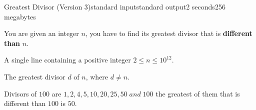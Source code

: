 \begin{problem}{Greatest Divisor (Version 3)}{standard input}{standard output}{2 seconds}{256 megabytes}

You are given an integer $n$, you have to find its greatest divisor that is \textbf{different than} $n$.

\InputFile
A single line containing a positive integer $2 \leq n \leq 10^{12} $.

\OutputFile
The greatest divisor $d$ of $n$, where $d \neq n$.

\Example

\begin{example}
%
\end{example}

\Note
Divisors of $100$ are $1, 2, 4, 5, 10, 20, 25, 50 \; and \; 100$ the greatest of them that is different than $100$ is $50$.

\end{problem}

